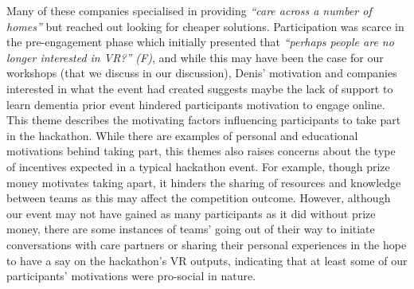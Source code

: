 Many of these companies specialised in providing \textit{“care across a number of homes”} but reached out looking for cheaper solutions. Participation was scarce in the pre-engagement phase which initially presented that\textit{ “perhaps people are no longer interested in VR?” (F)}, and while this may have been the case for our workshops (that we discuss in our discussion), Denis’ motivation and companies interested in what the event had created suggests maybe the lack of support to learn dementia prior event hindered participants motivation to engage online. This theme describes the motivating factors influencing participants to take part in the hackathon. While there are examples of personal and educational motivations behind taking part, this themes also raises concerns about the type of incentives expected in a typical hackathon event. For example, though prize money motivates taking apart, it hinders the sharing of resources and knowledge between teams as this may affect the competition outcome. However, although our event may not have gained as many participants as it did without prize money, there are some instances of teams’ going out of their way to initiate conversations with care partners or sharing their personal experiences in the hope to have a say on the hackathon’s VR outputs, indicating that at least some of our participants’ motivations were pro-social in nature.

